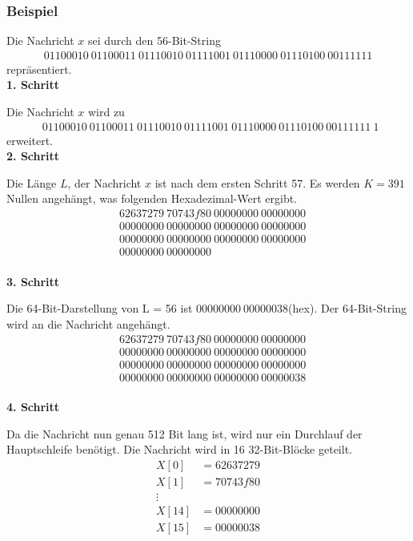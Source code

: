 \documentclass[12pt,a4paper]{scrartcl}
\numberwithin{equation}{section}
\numberwithin{myalgctr}{section}
\numberwithin{mytheoremctr}{section}
\begin{document}
	\subsubsection{Beispiel}
	Die Nachricht $x$ sei durch den 56-Bit-String 
	\begin{align*}
		 01100010~01100011~01110010~01111001~01110000~01110100~00111111
	\end{align*}
	repräsentiert.\\
	\noindent \textbf{1. Schritt}\par\noindent
	Die Nachricht $x$ wird zu
	\begin{align*}
	~~01100010~01100011~01110010~01111001~01110000~01110100~00111111~1
	\end{align*}
	erweitert.\\
	\noindent \textbf{2. Schritt}\par\noindent
	Die Länge $L$, der Nachricht $x$ ist nach dem ersten Schritt 57. Es werden $K=391$ Nullen angehängt, was folgenden Hexadezimal-Wert ergibt.
	\begin{align*}
	&62637279~70743f80~00000000~00000000\\
	&00000000~00000000~00000000~00000000\\
	&00000000~00000000~00000000~00000000\\
	&00000000~00000000
	\end{align*}
	\\
	\noindent \textbf{3. Schritt}\par\noindent
	Die 64-Bit-Darstellung von L = 56 ist $00000000~00000038$(hex). Der 64-Bit-String wird an die Nachricht angehängt.
	\begin{align*}
	&62637279~70743f80~00000000~00000000\\
	&00000000~00000000~00000000~00000000\\
	&00000000~00000000~00000000~00000000\\
	&00000000~00000000~00000000~00000038
	\end{align*}
	\\
	\noindent \textbf{4. Schritt}\par\noindent
	Da die Nachricht nun genau 512 Bit lang ist, wird nur ein Durchlauf der Hauptschleife benötigt. Die Nachricht wird in 16 32-Bit-Blöcke geteilt.
	\begin{align*}
	X[0] &= 62637279\\
	X[1] &= 70743f80\\
	\vdots \\
	X[14] &= 00000000\\
	X[15] &= 00000038
	\end{align*}
\end{document}
